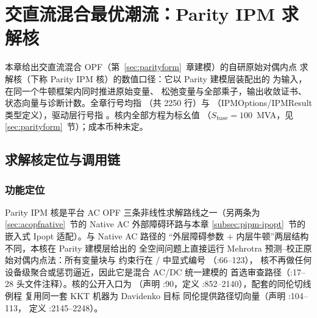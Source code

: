 \section{交直流混合最优潮流：Parity IPM 求解核}\label{sec:parityipm}

本章给出交直流混合 OPF（第~\ref{sec:parityform}~章建模）的自研原始对偶内点
求解核（下称 Parity IPM 核）的数值口径：它以 Parity 建模层装配出的
 为输入，在同一个牛顿框架内同时推进原始变量、
松弛变量与全部乘子，输出收敛证书、状态向量与诊断计数。全章行号均指
（共 2250 行）与
（IPMOptions/IPMResult 类型定义），驱动层行号指
。核内全部方程为标幺值
（$S_{\mathrm{base}}=100$~MVA，见 \ref{sec:parityform}~节）；成本币种未定。

\subsection{求解核定位与调用链}

\subsubsection*{功能定位}
Parity IPM 核是平台 AC OPF 三条非线性求解路线之一（另两条为
\ref{sec:acopfnative}~节的 Native AC 外部障碍环路与本章
\ref{subsec:pipm-ipopt}~节的嵌入式 Ipopt 适配）。与 Native AC 路径的
“外层障碍参数 $+$ 内层牛顿”两层结构不同，本核在 Parity 建模层给出的
全空间问题上直接运行 Mehrotra 预测--校正原始对偶内点法：所有变量块与
约束行在 / 中显式编号
（:66--123），
核不再做任何设备级聚合或惩罚逼近，因此它是混合 AC/DC 统一建模的
首选审查路径（:17--28
头文件注释）。核的公开入口为
（声明
:90，定义 :852--2140），配套的同伦切线
例程  复用同一套 KKT 机器为 Davidenko 目标
同伦提供路径切向量（声明 :104--113，
定义 :2145--2248）。

